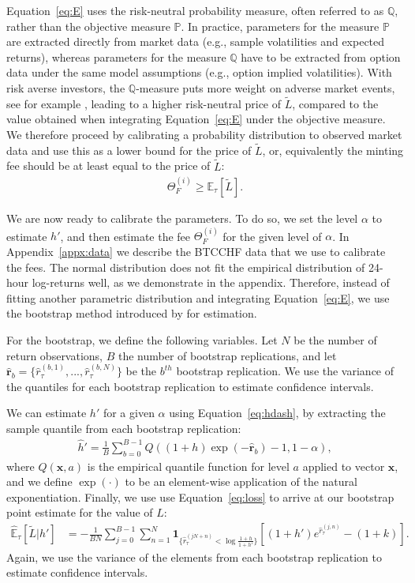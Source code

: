 \documentclass[english,11pt]{article}
\begin{document}
Equation~\eqref{eq:E} uses the risk-neutral probability measure, often referred to as
$\mathbb{Q}$, rather than the objective measure $\mathbb{P}$. In practice,
parameters for the measure $\mathbb{P}$ are extracted directly from market data
(e.g., sample volatilities and expected returns), whereas
parameters for the measure $\mathbb{Q}$ have to be extracted from option data
under the same model assumptions (e.g., option implied volatilities). 
With risk averse investors, the $\mathbb{Q}$-measure puts more
weight on adverse market events, see for example \cite{breeden1978prices}, leading
to a higher risk-neutral price of $\tilde{L}$, compared to the value obtained
when integrating Equation~\eqref{eq:E} under the objective measure.
We therefore proceed by calibrating a probability distribution to observed
market data and use this as a lower bound for the price of $\tilde{L}$, or,
equivalently the minting fee should be at least equal to the price of $\tilde{L}$:
\begin{align}
\Theta_F^{(i)} \geq \mathbb{E}_{\tau}\left[\tilde{L} \right].
\end{align}

We are now ready to calibrate the parameters. To do so, we set the level $\alpha$ 
to estimate $h'$, and then estimate the fee $\Theta_F^{(i)}$ for the given level of $\alpha$.
In Appendix~\ref{appx:data} we describe the BTCCHF data that we use to calibrate the
fees. The normal distribution does not fit the empirical distribution of 24-hour log-returns well, as we demonstrate in the appendix.
Therefore, instead of fitting another parametric distribution and integrating Equation~\eqref{eq:E}, we use 
the bootstrap method introduced by \cite{efron1992bootstrap} for estimation.

For the bootstrap, we define the following variables. Let $N$ be the number of return observations, $B$ the number of bootstrap replications,
and let $\mathbf{\hat{r}}_b = \{\hat{r}_{\tau}^{(b,1)},...,\hat{r}_{\tau}^{(b,N)}\}$ be
the $b^{th}$ bootstrap replication. We use the variance of the quantiles for each bootstrap replication to estimate confidence intervals.

We can estimate $h'$ for a given $\alpha$ using Equation~\eqref{eq:hdash}, by extracting the sample quantile from
each bootstrap replication:
\begin{align}
	\hat{h}' = \frac{1}{B} \sum_{b=0}^{B-1} Q((1+h)\exp(-\mathbf{\hat{r}}_b)-1, 1-\alpha),
\end{align}
where $Q(\mathbf{x}, a)$ is the empirical quantile function for level $a$ applied to vector $\mathbf{x}$, 
and we define $\exp(\cdot)$ to be an element-wise application of the natural exponentiation.
Finally, we use use Equation~\eqref{eq:loss} 
to arrive at our bootstrap point estimate for the value of $L$:
\begin{align}
\mathbb{\hat{E}}_{\tau}\left[\tilde{L} | h' \right] &= - \frac{1}{BN} \sum_{j=0}^{B-1} \sum_{n=1}^N 
	\mathbf{1}_{\{\hat{r}_{\tau}^{(jN+n)}<\log \frac{1+h}{1+h'}\}} 
	\left[(1 + h') e^{\hat{r}_{\tau}^{(j,n)}} - (1+k)\right].
\end{align}
Again, we use the variance of the elements from each bootstrap replication to estimate confidence intervals.
\end{document}
